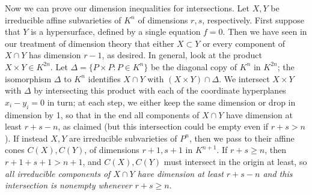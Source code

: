 \documentclass[10pt]{article}
\begin{document}
Now we can prove our dimension inequalities for intersections. Let $X,Y$
be irreducible affine subvarieties of $K^n$ of dimensions $r,s$,
respectively. First suppose that $Y$ is a hypersurface, defined by a
single equation $f=0$. Then we have seen in our treatment of dimension
theory that either $X\subset Y$ or every component of $X\cap Y$ has
dimension $r-1$, as desired. In general, look at the product $X\times
Y\in K^{2n}$. Let $\Delta = \{P\times P: P\in K^n\}$ be the diagonal
copy of $K^n$ in $K^{2n}$; the isomorphism $\Delta$ to $K^n$ identifies
$X\cap Y$ with $(X\times Y)\cap\Delta$. We intersect $X\times Y$ with
$\Delta$ by intersecting this product with each of the coordinate
hyperplanes $x_i - y_i = 0$ in turn; at each step, we either keep the
same dimension or drop in dimension by 1, so that in the end all
components of $X\cap Y$ have dimension at least $r+s-n$, as claimed (but
this intersection could be empty even if $r+s>n$). If instead $X,Y$ are
irreducible subvarieties of $P^n$, then we pass to their affine cones
$C(X),C(Y)$, of dimensions $r+1,s+1$ in $K^{n+1}$. If $r+s\ge n$, then
$r+1+s+1>n+1$, and $C(X),C(Y)$ must intersect in the origin at least, so
{\sl all irreducible components of $X\cap Y$ have dimension at least
  $r+s-n$ and this intersection is nonempty whenever $r+s\ge n$}.
\end{document}
